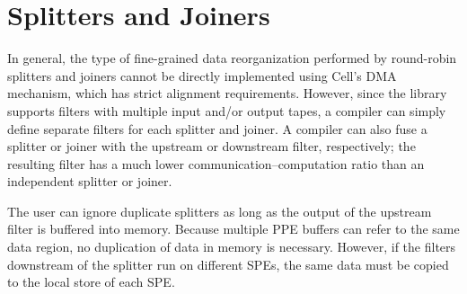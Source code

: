 \section{Splitters and Joiners}

In general, the type of fine-grained data reorganization performed by round-robin splitters and joiners cannot be directly implemented using Cell's DMA mechanism, which has strict alignment requirements. However, since the library supports filters with multiple input and/or output tapes, a compiler can simply define separate filters for each splitter and joiner. A compiler can also fuse a splitter or joiner with the upstream or downstream filter, respectively; the resulting filter has a much lower communication--computation ratio than an independent splitter or joiner.

The user can ignore duplicate splitters as long as the output of the upstream filter is buffered into memory. Because multiple PPE buffers can refer to the same data region, no duplication of data in memory is necessary. However, if the filters downstream of the splitter run on different SPEs, the same data must be copied to the local store of each SPE.
